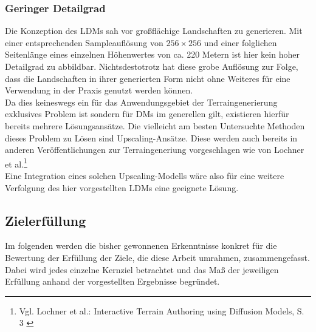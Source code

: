 \subsubsection{Geringer Detailgrad}

Die Konzeption des \ac{LDM}s sah vor großflächige Landschaften zu generieren. Mit einer entsprechenden Sampleauflösung von $256\times256$ und einer folglichen Seitenlänge eines einzelnen Höhenwertes von ca. 220 Metern ist hier kein hoher Detailgrad zu abbildbar. Nichtsdestotrotz hat diese grobe Auflösung zur Folge, dass die Landschaften in ihrer generierten Form nicht ohne Weiteres für eine Verwendung in der Praxis genutzt werden können. \\
Da dies keineswegs ein für das Anwendungsgebiet der Terraingenerierung exklusives Problem ist sondern für \ac{DM}s im generellen gilt, existieren hierfür bereits mehrere Lösungsansätze. Die vielleicht am besten Untersuchte Methoden dieses Problem zu Lösen sind Upscaling-Ansätze. Diese werden auch bereits in anderen Veröffentlichungen zur Terraingeneriung vorgeschlagen wie von Lochner et al.\footnote{
    Vgl. Lochner et al.: Interactive Terrain Authoring using Diffusion Models, S. 3
    \cite{lochner2023interactive}
} \\
Eine Integration eines solchen Upscaling-Modells wäre also für eine weitere Verfolgung des hier vorgestellten \ac{LDM}s eine geeignete Lösung.

\subsection{Zielerfüllung}

Im folgenden werden die bisher gewonnenen Erkenntnisse konkret für die Bewertung der Erfüllung der Ziele, die diese Arbeit umrahmen, zusammengefasst. Dabei wird jedes einzelne Kernziel betrachtet und das Maß der jeweiligen Erfüllung anhand der vorgestellten Ergebnisse begründet.


